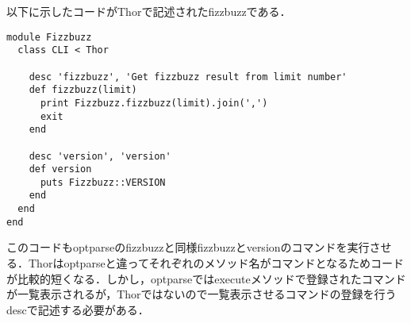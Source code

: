 以下に示したコードがThorで記述されたfizzbuzzである．
\begin{lstlisting}[style=customRuby]
module Fizzbuzz                                                   
  class CLI < Thor

    desc 'fizzbuzz', 'Get fizzbuzz result from limit number'
    def fizzbuzz(limit)
      print Fizzbuzz.fizzbuzz(limit).join(',')
      exit
    end

    desc 'version', 'version'
    def version
      puts Fizzbuzz::VERSION
    end
  end
end
\end{lstlisting}
このコードもoptparseのfizzbuzzと同様fizzbuzzとversionのコマンドを実行させる．Thorはoptparseと違ってそれぞれのメソッド名がコマンドとなるためコードが比較的短くなる．しかし，optparseではexecuteメソッドで登録されたコマンドが一覧表示されるが，Thorではないので一覧表示させるコマンドの登録を行うdescで記述する必要がある．

